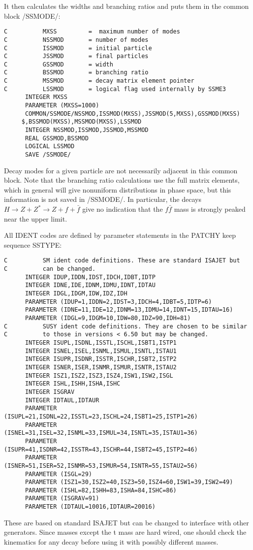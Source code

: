It then calculates the widths and branching ratios and puts them in the
common block /SSMODE/:
\begin{verbatim}
C          MXSS         =  maximum number of modes
C          NSSMOD       = number of modes
C          ISSMOD       = initial particle
C          JSSMOD       = final particles
C          GSSMOD       = width
C          BSSMOD       = branching ratio
C          MSSMOD       = decay matrix element pointer
C          LSSMOD       = logical flag used internally by SSME3
      INTEGER MXSS
      PARAMETER (MXSS=1000)
      COMMON/SSMODE/NSSMOD,ISSMOD(MXSS),JSSMOD(5,MXSS),GSSMOD(MXSS)
     $,BSSMOD(MXSS),MSSMOD(MXSS),LSSMOD
      INTEGER NSSMOD,ISSMOD,JSSMOD,MSSMOD
      REAL GSSMOD,BSSMOD
      LOGICAL LSSMOD
      SAVE /SSMODE/
\end{verbatim}
Decay modes for a given particle are not necessarily adjacent in this
common block.  Note that the branching ratio calculations use the full
matrix elements, which in general will give nonuniform distributions in
phase space, but this information is not saved in /SSMODE/.  In
particular, the decays $H \to Z + Z^* \to Z + f + \bar f$ give no
indication that the $f \bar f$ mass is strongly peaked near the upper
limit.

      All IDENT codes are defined by parameter statements in the PATCHY
keep sequence SSTYPE:
\begin{verbatim}
C          SM ident code definitions. These are standard ISAJET but
C          can be changed.
      INTEGER IDUP,IDDN,IDST,IDCH,IDBT,IDTP
      INTEGER IDNE,IDE,IDNM,IDMU,IDNT,IDTAU
      INTEGER IDGL,IDGM,IDW,IDZ,IDH
      PARAMETER (IDUP=1,IDDN=2,IDST=3,IDCH=4,IDBT=5,IDTP=6)
      PARAMETER (IDNE=11,IDE=12,IDNM=13,IDMU=14,IDNT=15,IDTAU=16)
      PARAMETER (IDGL=9,IDGM=10,IDW=80,IDZ=90,IDH=81)
C          SUSY ident code definitions. They are chosen to be similar
C          to those in versions < 6.50 but may be changed.
      INTEGER ISUPL,ISDNL,ISSTL,ISCHL,ISBT1,ISTP1
      INTEGER ISNEL,ISEL,ISNML,ISMUL,ISNTL,ISTAU1
      INTEGER ISUPR,ISDNR,ISSTR,ISCHR,ISBT2,ISTP2
      INTEGER ISNER,ISER,ISNMR,ISMUR,ISNTR,ISTAU2
      INTEGER ISZ1,ISZ2,ISZ3,ISZ4,ISW1,ISW2,ISGL
      INTEGER ISHL,ISHH,ISHA,ISHC
      INTEGER ISGRAV
      INTEGER IDTAUL,IDTAUR
      PARAMETER (ISUPL=21,ISDNL=22,ISSTL=23,ISCHL=24,ISBT1=25,ISTP1=26)
      PARAMETER (ISNEL=31,ISEL=32,ISNML=33,ISMUL=34,ISNTL=35,ISTAU1=36)
      PARAMETER (ISUPR=41,ISDNR=42,ISSTR=43,ISCHR=44,ISBT2=45,ISTP2=46)
      PARAMETER (ISNER=51,ISER=52,ISNMR=53,ISMUR=54,ISNTR=55,ISTAU2=56)
      PARAMETER (ISGL=29)
      PARAMETER (ISZ1=30,ISZ2=40,ISZ3=50,ISZ4=60,ISW1=39,ISW2=49)
      PARAMETER (ISHL=82,ISHH=83,ISHA=84,ISHC=86)
      PARAMETER (ISGRAV=91)
      PARAMETER (IDTAUL=10016,IDTAUR=20016)
\end{verbatim}
These are based on standard ISAJET but can be changed to interface with
other generators.  Since masses except the t mass are hard wired, one
should check the kinematics for any decay before using it with possibly
different masses.


